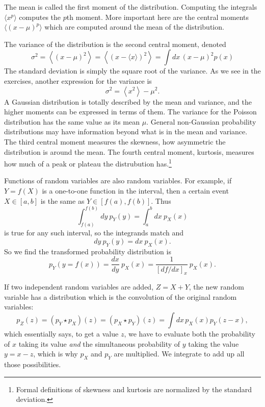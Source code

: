 The mean is called the first moment of the distribution.  Computing the integrals $\langle x^p \rangle$ computes the $p$th moment.  More important here are the central moments $\langle (x-\mu)^p \rangle$ which are computed around the mean of the distribution.

The variance of the distribution is the second central moment, denoted
\begin{equation}
  \sigma^2 = \left\langle (x - \mu)^2 \right\rangle = \left\langle (x - \langle x \rangle)^2 \right\rangle =  \int dx\,  (x-\mu)^2  p(x) 
\end{equation}
The standard deviation is simply the square root of the variance.  As we see in the exercises, another expression for the variance is
\begin{equation}
  \sigma^2 = \left\langle x^2\right\rangle - \mu^2. \label{eqn:variance_diff_squares}
\end{equation}
A Gaussian distribution is totally described by the mean and variance, and the higher moments can be expressed in terms of them.  The variance for the Poisson distribution has the same value as its mean $\mu$.  General non-Gaussian probability distributions may have information beyond what is in the mean and variance.   The third central moment measures the skewness, how asymmetric the distribution is around the mean.  The fourth central moment, kurtosis, measures how much of a peak or plateau the distrubution has.\footnote{Formal definitions of skewness and kurtosis are normalized by the standard deviation.}  


  
Functions of random variables are also random variables. For example, if $Y=f(X)$ is a one-to-one function in the interval, then a certain event $ X \in [a, b]$ is the same as $Y \in [f(a),f(b)]$. Thus
\begin{equation}
  \int_{f(a)}^{f(b)} dy \ p_Y(y) = \int_{a}^{b} dx \ p_X(x)
\end{equation}
is true for any such interval, so the integrands match and
\begin{equation}
  dy \ p_Y(y) =  dx \ p_X(x).
\end{equation}
So we find the transformed probability distribution is  
\begin{equation}
  p_Y(y = f(x)) =  \frac{dx}{dy} \ p_X(x) = \frac{1}{[df/dx]_x}  \ p_X(x).
\end{equation}

If two independent random variables are added, $Z = X+Y$, the new random variable has a distribution which is the convolution of the original random variables:
\begin{equation}
  p_Z(z) = (p_Y \star p_X)(z) = (p_X \star p_Y)(z)  = \int dx\, p_X(x) p_Y(z - x),
\end{equation}
which essentially says, to get a value $z$, we have to evaluate both the probability of $x$ taking its value \textit{and} the simultaneous probability of $y$ taking the value $y = x-z$, which is why $p_X$ and $p_Y$ are multiplied.  We integrate to add up all those possibilities.

